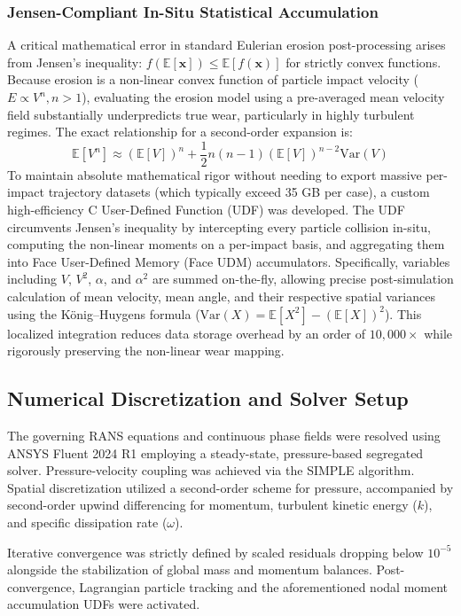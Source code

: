 \documentclass{article}
\begin{document}
\subsubsection{Jensen-Compliant In-Situ Statistical Accumulation}
A critical mathematical error in standard Eulerian erosion post-processing arises from Jensen's inequality: $f(\mathbb{E}[\mathbf{x}]) \le \mathbb{E}[f(\mathbf{x})]$ for strictly convex functions. Because erosion is a non-linear convex function of particle impact velocity ($E \propto V^n, n>1$), evaluating the erosion model using a pre-averaged mean velocity field substantially underpredicts true wear, particularly in highly turbulent regimes. The exact relationship for a second-order expansion is:
\begin{equation}
    \mathbb{E}[V^n] \approx (\mathbb{E}[V])^n + \frac{1}{2} n (n-1) (\mathbb{E}[V])^{n-2} \text{Var}(V)
\end{equation}
To maintain absolute mathematical rigor without needing to export massive per-impact trajectory datasets (which typically exceed 35 GB per case), a custom high-efficiency C User-Defined Function (UDF) was developed. The UDF circumvents Jensen's inequality by intercepting every particle collision in-situ, computing the non-linear moments on a per-impact basis, and aggregating them into Face User-Defined Memory (Face UDM) accumulators. Specifically, variables including $V$, $V^2$, $\alpha$, and $\alpha^2$ are summed on-the-fly, allowing precise post-simulation calculation of mean velocity, mean angle, and their respective spatial variances using the König–Huygens formula ($\text{Var}(X) = \mathbb{E}[X^2] - (\mathbb{E}[X])^2$). This localized integration reduces data storage overhead by an order of $10,000\times$ while rigorously preserving the non-linear wear mapping.

\subsection{Numerical Discretization and Solver Setup}
The governing RANS equations and continuous phase fields were resolved using ANSYS Fluent 2024 R1 employing a steady-state, pressure-based segregated solver. Pressure-velocity coupling was achieved via the SIMPLE algorithm. Spatial discretization utilized a second-order scheme for pressure, accompanied by second-order upwind differencing for momentum, turbulent kinetic energy ($k$), and specific dissipation rate ($\omega$). 

Iterative convergence was strictly defined by scaled residuals dropping below $10^{-5}$ alongside the stabilization of global mass and momentum balances. Post-convergence, Lagrangian particle tracking and the aforementioned nodal moment accumulation UDFs were activated. 
\end{document}
